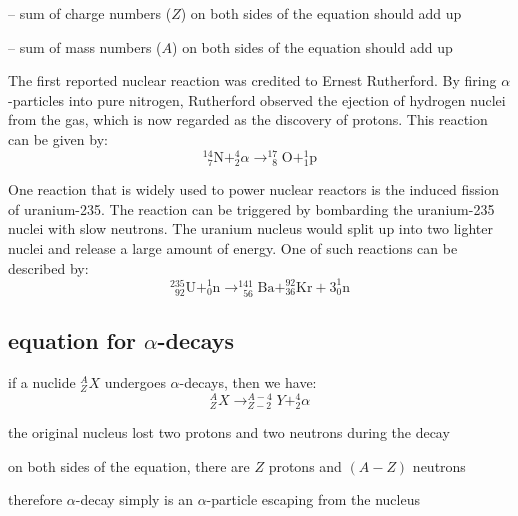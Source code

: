 \begin{compactenum}
	\item[--] sum of charge numbers ($Z$) on both sides of the equation should add up
	
	\item[--] sum of mass numbers ($A$) on both sides of the equation should add up
\end{compactenum}


The first reported nuclear reaction was credited to Ernest Rutherford. By firing $\alpha$-particles into pure nitrogen, Rutherford observed the ejection of hydrogen nuclei from the gas, which is now regarded as the discovery of protons. This reaction can be given by:
\begin{equation*}
_{\phantom{0}7}^{14} \text{N} + _2^4 \alpha \longrightarrow _{\phantom{0}8}^{17} \text{O} + _{1}^{1} \text{p} 
\end{equation*} 


One reaction that is widely used to power nuclear reactors is the induced fission of uranium-235. The reaction can be triggered by bombarding the uranium-235 nuclei with slow neutrons. The uranium nucleus would split up into two lighter nuclei and release a large amount of energy. One of such reactions can be described by:
\begin{equation*}
 _{\phantom{0}92}^{235} \text{U} + _0^1 \text{n} \longrightarrow _{\phantom{0}56}^{141} \text{Ba} + _{36}^{92} \text{Kr} + 3_0^1 \text{n} 
\end{equation*} 




\subsection*{equation for \texorpdfstring{$\alpha$}{\textalpha}-decays}

if a nuclide $_Z^A X$ undergoes $\alpha$-decays, then we have:
\begin{equation*}
\boxed{_Z^A X \longrightarrow _{Z-2}^{A-4} Y + _2^4\alpha}
\end{equation*}

the original nucleus lost two protons and two neutrons during the decay

on both sides of the equation, there are $Z$ protons and $(A-Z)$ neutrons

therefore $\alpha$-decay simply is an $\alpha$-particle escaping from the nucleus



